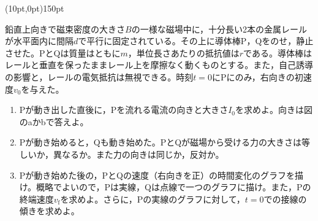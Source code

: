 \hakosyokika
\item
    \begin{mawarikomi}(10pt,0pt){150pt}{
        
    }
    鉛直上向きで磁束密度の大きさ$B$の一様な磁場中に，十分長い2本の金属レールが水平面内に間隔$d$で平行に固定されている。その上に導体棒P，Qをのせ，静止させた。PとQは質量はともに$m$，単位長さあたりの抵抗値は$r$である。導体棒はレールと垂直を保ったままレール上を摩擦なく動くものとする。また，自己誘導の影響と，レールの電気抵抗は無視できる。時刻$t=0$にPにのみ，右向きの初速度$v_0$を与えた。
        \begin{enumerate}
            \item Pが動き出した直後に，Pを流れる電流の向きと大きさ$I_0$を求めよ。向きは図のaかbで答えよ。
            \item Pが動き始めると，Qも動き始めた。PとQが磁場から受ける力の大きさは等しいか，異なるか。また力の向きは同じか，反対か。
            \item Pが動き始めた後の，PとQの速度（右向きを正）の時間変化のグラフを描け。概略でよいので，Pは実線，Qは点線で一つのグラフに描け。また，Pの終端速度$v_\mathrm{f}$を求めよ。さらに，Pの実線のグラフに対して，$t=0$での接線の傾きを求めよ。
        \end{enumerate}
    \end{mawarikomi}